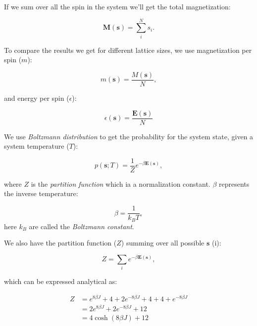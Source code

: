 \documentclass[english,notitlepage,reprint,nofootinbib]{revtex4-1}  %
\begin{document}
If we sum over all the spin in the system we'll get the total magnetization:

\begin{equation}
    \mathbf{M} (\mathbf{s}) = \sum\limits_i^N s_i.
\end{equation}

To compare the results we get for different lattice sizes, we use magnetization per spin ($m$): 

\begin{equation}
    m (\mathbf{s}) = \frac{M(\mathbf{s})}{N},
\end{equation}

and energy per spin ($\epsilon$):

\begin{equation}
    \epsilon (\mathbf{s}) = \frac{\mathbf{E}(\mathbf{s})}{N}
\end{equation}

We use \textit{Boltzmann distribution} to get the probability for the system state, given a system temperature ($T$):

\begin{equation}
    p(\mathbf{s} ; T) = \frac{1}{Z} e^{- \beta \mathbf{E}(\mathbf{s})},
\end{equation}

where $Z$ is the \textit{partition function} which ia a normalization constant. $\beta$ represents the inverse temperature:

\begin{equation}
    \beta = \frac{1}{k_B T},
\end{equation}
here $k_B$ are called the \textit{Boltzmann constant}.

We also have the partition function ($Z$) summing over all possible $\textbf{s}$ (i):

\begin{equation}
    Z = \sum\limits_{i} e^{- \beta \mathbf{E}(\mathbf{s})},
\end{equation}

which can be expressed analytical as:

\begin{align*}
    Z %
    &= e^{8 \beta J} + 4 + 2 e^{-8 \beta J} + 4 + 4 + e^{-8 \beta J} \\
    &= 2e^{8 \beta J} + 2e^{-8 \beta J} + 12 \\
    &= 4 \cosh (8 \beta J) + 12
\end{align*}
\end{document}
